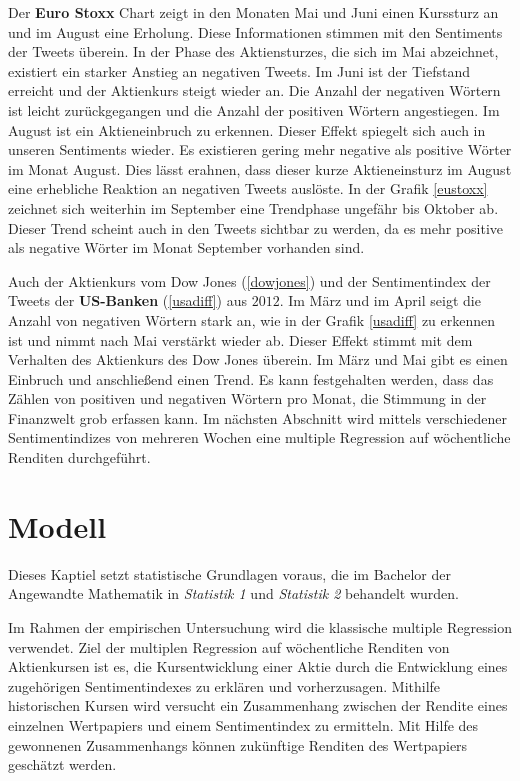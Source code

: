 Der \textbf{Euro Stoxx} Chart zeigt in den Monaten Mai und Juni einen Kurssturz an und im August eine Erholung. Diese Informationen stimmen mit den Sentiments der Tweets überein. In der Phase des Aktiensturzes, die sich im Mai abzeichnet, existiert ein starker Anstieg an negativen Tweets. Im Juni ist der Tiefstand erreicht und der Aktienkurs steigt wieder an. Die Anzahl der negativen Wörtern ist leicht zurückgegangen und die Anzahl der positiven Wörtern angestiegen. Im August ist ein Aktieneinbruch zu erkennen. Dieser Effekt spiegelt sich auch in unseren Sentiments wieder. Es existieren gering mehr negative als positive Wörter im Monat August. Dies lässt erahnen, dass dieser kurze Aktieneinsturz im August eine erhebliche Reaktion an negativen Tweets auslöste. In der Grafik \ref{eustoxx} zeichnet sich weiterhin im September eine Trendphase ungefähr bis Oktober ab. Dieser Trend scheint auch in den Tweets sichtbar zu werden, da es mehr positive als negative Wörter im Monat September vorhanden sind. 

Auch der Aktienkurs vom Dow Jones (\ref{dowjones}) und der Sentimentindex der Tweets der \textbf{US-Banken} (\ref{usadiff}) aus $2012$. Im März und im April seigt die Anzahl von negativen Wörtern stark an, wie in der Grafik \ref{usadiff} zu erkennen ist und nimmt nach Mai verstärkt wieder ab. Dieser Effekt stimmt mit dem Verhalten des Aktienkurs des Dow Jones überein. Im März und Mai gibt es einen Einbruch und anschließend einen Trend. Es kann festgehalten werden, dass das Zählen von positiven und negativen Wörtern pro Monat, die Stimmung in der Finanzwelt grob erfassen kann. Im nächsten Abschnitt wird mittels verschiedener Sentimentindizes von mehreren Wochen eine multiple Regression auf wöchentliche Renditen durchgeführt.

\section{Modell}\label{Model}
Dieses Kaptiel setzt statistische Grundlagen voraus, die im Bachelor der Angewandte Mathematik in \textit{Statistik 1} und \textit{Statistik 2} behandelt wurden. 
 
Im Rahmen der empirischen Untersuchung wird die klassische multiple Regression verwendet. Ziel der multiplen Regression auf wöchentliche Renditen von Aktienkursen ist es, die Kursentwicklung einer Aktie durch die Entwicklung eines zugehörigen Sentimentindexes zu erklären und vorherzusagen. Mithilfe historischen Kursen wird versucht ein Zusammenhang zwischen der Rendite eines einzelnen Wertpapiers und einem Sentimentindex zu ermitteln. Mit Hilfe des gewonnenen Zusammenhangs können zukünftige Renditen des Wertpapiers geschätzt werden. \\

